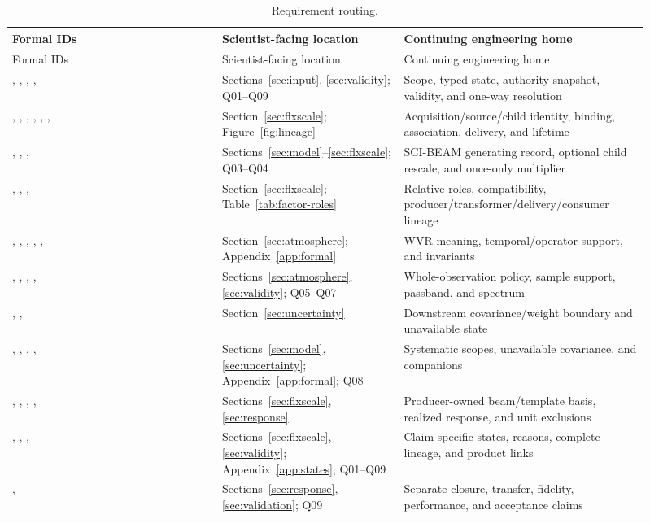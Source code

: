 \begin{longtable}{L{0.30\linewidth}L{0.26\linewidth}L{0.35\linewidth}}
\caption{Requirement routing.}\\
\toprule Formal IDs & Scientist-facing location & Continuing engineering home \\
\midrule\endfirsthead\toprule Formal IDs & Scientist-facing location & Continuing engineering home \\
\midrule\endhead
{}, , , ,  & Sections~\ref{sec:input}, \ref{sec:validity}; Q01--Q09 & Scope, typed state, authority snapshot, validity, and one-way resolution \\
, , , , , ,  & Section~\ref{sec:flxscale}; Figure~\ref{fig:lineage} & Acquisition/source/child identity, binding, association, delivery, and lifetime \\
, , ,  & Sections~\ref{sec:model}--\ref{sec:flxscale}; Q03--Q04 & SCI-BEAM generating record, optional child rescale, and once-only multiplier \\
, , ,  & Section~\ref{sec:flxscale}; Table~\ref{tab:factor-roles} & Relative roles, compatibility, producer/transformer/delivery/consumer lineage \\
, , , , ,  & Section~\ref{sec:atmosphere}; Appendix~\ref{app:formal} & WVR meaning, temporal/operator support, and invariants \\
, , , ,  & Sections~\ref{sec:atmosphere}, \ref{sec:validity}; Q05--Q07 & Whole-observation policy, sample support, passband, and spectrum \\
, ,  & Section~\ref{sec:uncertainty} & Downstream covariance/weight boundary and unavailable state \\
, , , ,  & Sections~\ref{sec:model}, \ref{sec:uncertainty}; Appendix~\ref{app:formal}; Q08 & Systematic scopes, unavailable covariance, and companions \\
, , , ,  & Sections~\ref{sec:flxscale}, \ref{sec:response} & Producer-owned beam/template basis, realized response, and unit exclusions \\
, , ,  & Sections~\ref{sec:flxscale}, \ref{sec:validity}; Appendix~\ref{app:states}; Q01--Q09 & Claim-specific states, reasons, complete lineage, and product links \\
,  & Sections~\ref{sec:response}, \ref{sec:validation}; Q09 & Separate closure, transfer, fidelity, performance, and acceptance claims \\
\bottomrule
\end{longtable}

